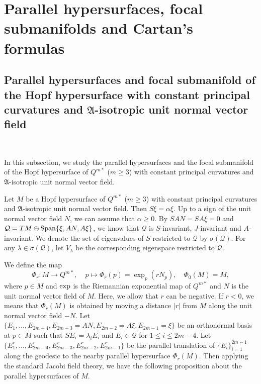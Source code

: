 \documentclass[reqno]{amsart}%
\theoremstyle{definition}
\numberwithin{equation}{section}
\begin{document}
\section{Parallel hypersurfaces, focal submanifolds and Cartan's formulas}\label{sect:4}


\subsection{Parallel hypersurfaces and focal submanifold of the Hopf hypersurface with constant principal curvatures and $\mathfrak{A}$-isotropic unit normal vector field}\label{sect:4.1}~

In this subsection, we study the parallel hypersurfaces and the focal submanifold of the Hopf hypersurface of $Q^{m*}$ ($m\geq3$) with constant principal curvatures and $\mathfrak{A}$-isotropic unit normal vector field.

Let $M$ be a Hopf hypersurface of $Q^{m*}$ ($m\geq3$) with constant principal curvatures and $\mathfrak{A}$-isotropic unit normal vector field. Then $S\xi=\alpha\xi$. Up to a sign of the unit normal vector field $N$, we can assume that $\alpha\geq0$. By $SAN=SA\xi=0$
and $\mathcal{Q}=TM\ominus{\rm Span}\{\xi,AN,A\xi\}$,
we know that $\mathcal{Q}$ is $S$-invariant, $J$-invariant and $A$-invariant. We denote the set
of eigenvalues of $S$ restricted to $\mathcal{Q}$ by $\sigma(\mathcal{Q})$.
For any $\lambda\in\sigma(\mathcal{Q})$, let $V_\lambda$ be the corresponding eigenspace
restricted to $\mathcal{Q}$.

We define the map
$$
\Phi_r: M\rightarrow Q^{m*},\ \ \ \ \ p \mapsto \Phi_r(p)=\exp_{p}(rN_{p}), \quad \Phi_{0}(M)=M,
$$
where $p\in M$ and ${\rm exp}$ is the Riemannian exponential map of $Q^{m*}$
and $N$ is the unit normal vector field of $M$. Here, we allow that $r$ can be negative. If $r<0$, we means that $\Phi_r(M)$ is obtained by moving a distance $|r|$ from $M$ along the unit normal vector field $-N$. Let $\{E_1,\ldots, E_{2m-4},E_{2m-3}=AN,E_{2m-2}=A\xi,E_{2m-1}=\xi\}$ be an orthonormal basis at $p\in M$
such that $SE_i=\lambda_iE_i$ and $E_i\in\mathcal{Q}$ for $1\leq i\leq 2m-4$.
Let $\{E_1^r,\ldots, E_{2m-4}^r,E_{2m-3}^r,E_{2m-2}^r,E_{2m-1}^r\}$
be the parallel translation of $\{E_i\}_{i=1}^{2m-1}$ along the geodesic to the nearby parallel hypersurface $\Phi_r(M)$.
Then applying the standard Jacobi field theory,
we have the following proposition about the parallel hypersurfaces of $M$.
\end{document}
